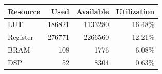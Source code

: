 \begin{tabular}{lrrr}
\toprule
Resource & Used & Available & Utilization \\
\midrule
LUT & 186821 & 1133280 & 16.48\% \\
Register & 276771 & 2266560 & 12.21\% \\
BRAM & 108 & 1776 & 6.08\% \\
DSP & 52 & 8304 & 0.63\% \\
\bottomrule
\end{tabular}

